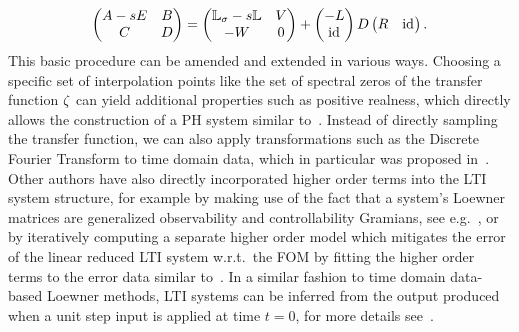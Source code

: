 \begin{equation}\label{eq:loewner-realization}
    \begin{pmatrix}
        A - sE & B \\
        C & D
    \end{pmatrix} = \begin{pmatrix}
        \mathbb{L}_\sigma - s \mathbb{L} & V \\
        -W & 0
    \end{pmatrix} + \begin{pmatrix}
        -L \\
        \text{id}_{}
    \end{pmatrix} D \begin{pmatrix}
        R & \text{id}_{}
    \end{pmatrix}.
\end{equation}
This basic procedure can be amended and extended in various ways.
Choosing a specific set of interpolation points like the set of spectral zeros of the transfer function $\zeta$ can yield additional properties such as positive realness, which directly allows the construction of a \ac{PH} system similar to~\cite{BGD2020, Poussot2022}.
Instead of directly sampling the transfer function, we can also apply transformations such as the Discrete Fourier Transform to time domain data, which in particular was proposed in~\cite{Peherstorfer2017, Cherifi2021}.
Other authors have also directly incorporated higher order terms into the \ac{LTI} system structure, for example by making use of the fact that a system's Loewner matrices are generalized observability and controllability Gramians, see e.g.~\cite{Antoulas2019}, or by iteratively computing a separate higher order model which mitigates the error of the linear reduced \ac{LTI} system w.r.t.\ the \ac{FOM} by fitting the higher order terms to the error data similar to~\cite{GKA2021}.
In a similar fashion to time domain data-based Loewner methods, \ac{LTI} systems can be inferred from the output produced when a unit step input is applied at time $t = 0$, for more details see~\cite{Miller2012}.

